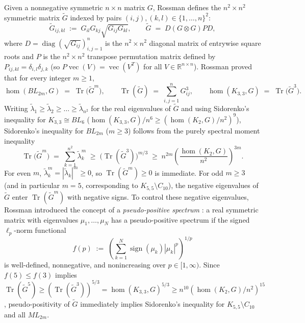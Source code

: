 \documentclass[11pt,a4paper]{article}
\theoremstyle{plain}
\theoremstyle{definition}
\theoremstyle{remark}
\DeclareMathOperator{\Tr}{Tr}
\DeclareMathOperator{\vecop}{vec}
\DeclareMathOperator{\diag}{diag}
\DeclareMathOperator{\sign}{sign}
\DeclareMathOperator{\homop}{hom}
\begin{document}
Given a nonnegative symmetric $n \times n$ matrix $G$, Rossman defines the $n^2 \times n^2$ symmetric matrix $\widetilde{G}$ indexed by pairs $(i,j), (k,l) \in \{1,\dots,n\}^2$:
\begin{equation}\label{eq:Gtilde}
  \widetilde{G}_{ij,kl} \;:=\; G_{il} G_{kj} \sqrt{G_{ij} G_{kl}}, \qquad \widetilde{G} \;=\; D (G \otimes G) P D,
\end{equation}
where $D = \diag(\sqrt{G_{ij}})_{i,j=1}^n$ is the $n^2 \times n^2$ diagonal matrix of entrywise square roots and $P$ is the $n^2 \times n^2$ transpose permutation matrix defined by $P_{ij,kl} = \delta_{i,l}\delta_{j,k}$ (so $P \vecop(V) = \vecop(V^T)$ for all $V \in \mathbb{R}^{n \times n}$). Rossman proved \cite[Lemma~2.1]{Rossman2025} that for every integer $m \ge 1$,
\begin{equation}\label{eq:trace_ladder}
  \homop(BL_{2m}, G) \;=\; \Tr\big(\widetilde{G}^m\big), \qquad \Tr(\widetilde{G}) \;=\; \sum_{i,j=1}^n G_{ij}^3, \qquad \homop(K_{3,3}, G) \;=\; \Tr\big(\widetilde{G}^3\big).
\end{equation}
Writing $\widetilde{\lambda}_1 \ge \widetilde{\lambda}_2 \ge \dots \ge \widetilde{\lambda}_{n^2}$ for the real eigenvalues of $\widetilde{G}$ and using Sidorenko's inequality for $K_{3,3} \cong BL_6$ ($\homop(K_{3,3}, G)/n^6 \ge (\homop(K_2, G)/n^2)^9$), Sidorenko's inequality for $BL_{2m}$ ($m \ge 3$) follows from the purely spectral moment inequality
\begin{equation}\label{eq:spectral_sidorenko}
  \Tr\big(\widetilde{G}^m\big) \;=\; \sum_{k=1}^{n^2} \widetilde{\lambda}_k^m \;\ge\; \big(\Tr(\widetilde{G}^3)\big)^{m/3} \;\ge\; n^{2m}\left(\frac{\homop(K_2, G)}{n^2}\right)^{3m}.
\end{equation}
For even $m$, $\widetilde{\lambda}_k^m = |\widetilde{\lambda}_k|^m \ge 0$, so $\Tr(\widetilde{G}^m) \ge 0$ is immediate. For odd $m \ge 3$ (and in particular $m = 5$, corresponding to $K_{5,5} \setminus C_{10}$), the negative eigenvalues of $\widetilde{G}$ enter $\Tr(\widetilde{G}^m)$ with negative signs. To control these negative eigenvalues, Rossman introduced the concept of a \emph{pseudo-positive spectrum} \cite[Definition~3.1]{Rossman2025}: a real symmetric matrix with eigenvalues $\mu_1,\dots,\mu_N$ has a pseudo-positive spectrum if the signed $\ell_p$-norm functional
\begin{equation}\label{eq:fp}
  f(p) \;:=\; \left(\sum_{k=1}^N \sign(\mu_k)|\mu_k|^p\right)^{1/p}
\end{equation}
is well-defined, nonnegative, and nonincreasing over $p \in [1, \infty)$. Since $f(5) \le f(3)$ implies $\Tr(\widetilde{G}^5) \ge (\Tr(\widetilde{G}^3))^{5/3} = \homop(K_{3,3}, G)^{5/3} \ge n^{10}(\homop(K_2, G)/n^2)^{15}$, pseudo-positivity of $\widetilde{G}$ immediately implies Sidorenko's inequality for $K_{5,5} \setminus C_{10}$ and all $ML_{2m}$.
\end{document}
